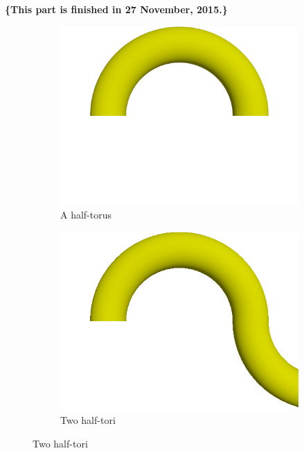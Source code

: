 \documentclass[fleqn,10pt]{wlscirep}
\begin{document}
\textbf{\{This part is finished in  27 November, 2015.\}}\\
\newline
\begin{figure}
\begin{subfigure}{0.31\textwidth}
\includegraphics[width=\linewidth]{FIG8a}
\caption{A half-torus} \label{fig:FIG8a}
\end{subfigure}
\hspace*{\fill} %
\begin{subfigure}{0.31\textwidth}
\includegraphics[width=\linewidth]{FIG8b}
\caption{Two half-tori} \label{fig:FIG8b}
\end{subfigure}
\hspace*{\fill} %

\end{figure}
\end{document}
